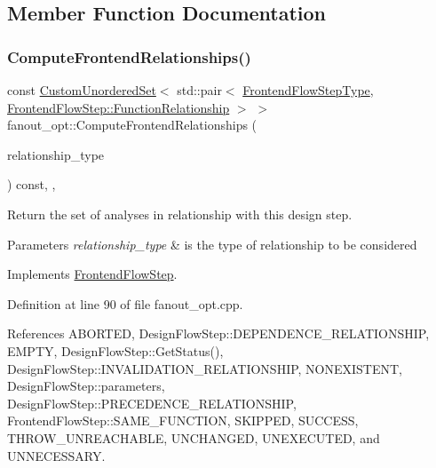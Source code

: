 \subsection{Member Function Documentation}
\mbox{\label{classfanout__opt_aa781d3ef037625b718dbc83764bc940f}} 
\subsubsection{\texorpdfstring{Compute\+Frontend\+Relationships()}{ComputeFrontendRelationships()}}
{\footnotesize\ttfamily const \hyperlink{classCustomUnorderedSet}{Custom\+Unordered\+Set}$<$ std\+::pair$<$ \hyperlink{frontend__flow__step_8hpp_afeb3716c693d2b2e4ed3e6d04c3b63bb}{Frontend\+Flow\+Step\+Type}, \hyperlink{classFrontendFlowStep_af7cf30f2023e5b99e637dc2058289ab0}{Frontend\+Flow\+Step\+::\+Function\+Relationship} $>$ $>$ fanout\+\_\+opt\+::\+Compute\+Frontend\+Relationships (\begin{DoxyParamCaption}\item[{const \hyperlink{classDesignFlowStep_a723a3baf19ff2ceb77bc13e099d0b1b7}{Design\+Flow\+Step\+::\+Relationship\+Type}}]{relationship\+\_\+type }\end{DoxyParamCaption}) const\hspace{0.3cm}{\ttfamily [override]}, {\ttfamily [private]}, {\ttfamily [virtual]}}



Return the set of analyses in relationship with this design step. 


\begin{DoxyParams}{Parameters}
{\em relationship\+\_\+type} & is the type of relationship to be considered \\
\hline
\end{DoxyParams}


Implements \hyperlink{classFrontendFlowStep_abeaff70b59734e462d347ed343dd700d}{Frontend\+Flow\+Step}.



Definition at line 90 of file fanout\+\_\+opt.\+cpp.



References A\+B\+O\+R\+T\+ED, Design\+Flow\+Step\+::\+D\+E\+P\+E\+N\+D\+E\+N\+C\+E\+\_\+\+R\+E\+L\+A\+T\+I\+O\+N\+S\+H\+IP, E\+M\+P\+TY, Design\+Flow\+Step\+::\+Get\+Status(), Design\+Flow\+Step\+::\+I\+N\+V\+A\+L\+I\+D\+A\+T\+I\+O\+N\+\_\+\+R\+E\+L\+A\+T\+I\+O\+N\+S\+H\+IP, N\+O\+N\+E\+X\+I\+S\+T\+E\+NT, Design\+Flow\+Step\+::parameters, Design\+Flow\+Step\+::\+P\+R\+E\+C\+E\+D\+E\+N\+C\+E\+\_\+\+R\+E\+L\+A\+T\+I\+O\+N\+S\+H\+IP, Frontend\+Flow\+Step\+::\+S\+A\+M\+E\+\_\+\+F\+U\+N\+C\+T\+I\+ON, S\+K\+I\+P\+P\+ED, S\+U\+C\+C\+E\+SS, T\+H\+R\+O\+W\+\_\+\+U\+N\+R\+E\+A\+C\+H\+A\+B\+LE, U\+N\+C\+H\+A\+N\+G\+ED, U\+N\+E\+X\+E\+C\+U\+T\+ED, and U\+N\+N\+E\+C\+E\+S\+S\+A\+RY.

